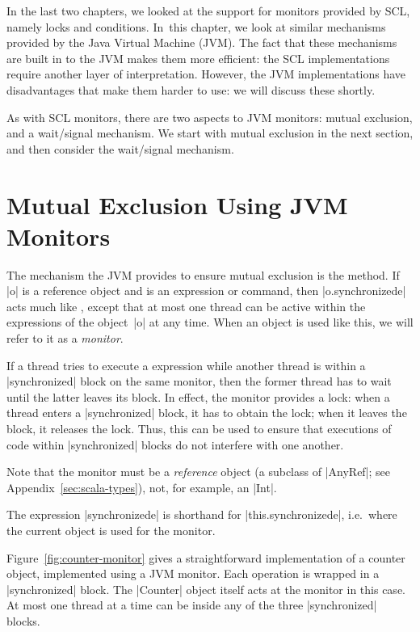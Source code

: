 In the last two chapters, we looked at the support for monitors provided by
SCL, namely locks and conditions.  In~this chapter, we look at similar
mechanisms provided by the Java Virtual Machine (JVM).  The fact that these
mechanisms are built in to the JVM makes them more efficient: the SCL
implementations require another layer of interpretation.  However, the JVM
implementations have disadvantages that make them harder to use: we will
discuss these shortly.

As with SCL monitors, there are two aspects to JVM monitors: mutual exclusion,
and a wait/signal mechanism.  We start with mutual exclusion in the next
section, and then consider the wait/signal mechanism.


\section{Mutual Exclusion Using JVM Monitors}
\label{sec:JVM-monitors-ME}

The mechanism the JVM provides to ensure mutual exclusion is the
 method.  
%
If |o| is a reference object and  is an expression or command, then
|o.synchronized{e}| acts much like , except that at most one thread
can be active within the %
 expressions
of the object~|o| at any time.  When an object is used like this, we will
refer to it as a \emph{monitor}.

If a thread tries to execute a  expression while another
thread is within a |synchronized| block on the same monitor, then the former
thread has to wait until the latter leaves its block.  In effect, the monitor
provides a lock: when a thread enters a |synchronized| block, it has to obtain
the lock; when it leaves the block, it releases the lock.  Thus, this can be
used to ensure that executions of code within |synchronized| blocks do not
interfere with one another.

Note that the monitor must be a \emph{reference} object (a subclass of
|AnyRef|; see Appendix~\ref{sec:scala-types}), not, for example, an |Int|.

The expression |synchronized{e}| is shorthand for |this.synchronized{e}|,
i.e.~where the current object is used for the monitor.

Figure~\ref{fig:counter-monitor} gives a straightforward implementation of a
counter object, implemented using a JVM monitor.  Each operation is wrapped in
a |synchronized| block.  The |Counter| object itself acts at the monitor in
this case.  At most one thread at a time can be inside any of the three
|synchronized| blocks.

